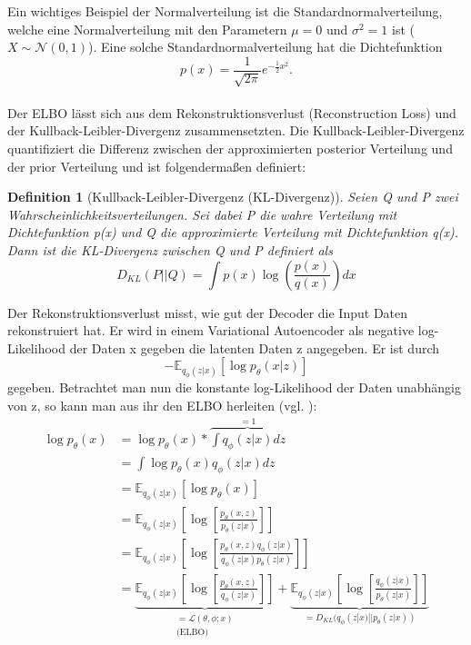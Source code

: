 \documentclass[%
thesis=student,%
coverpage=false,%
titlepage=false,%
headmarks=true, %
german,%
font=libertine, %
math=newpxtx, %
BCOR=5mm,%
coverBCOR=11mm%
]{tumbook}
\theoremstyle{break}
\newtheorem{definition}{Definition}[section]
\begin{document}
Ein wichtiges Beispiel der Normalverteilung ist die Standardnormalverteilung, welche eine Normalverteilung mit den Parametern $\mu = 0$ und  $\sigma^2 = 1$ ist ($X \sim \mathcal{N}(0,1)$). Eine solche Standardnormalverteilung hat die Dichtefunktion\\
$$p(x) = \frac{1}{\sqrt{2\pi}} e^{-\frac{1}{2}x^2}.$$
\\
Der ELBO lässt sich aus dem Rekonstruktionsverlust (Reconstruction Loss) und der Kullback-Leibler-Divergenz zusammensetzten. Die Kullback-Leibler-Divergenz quantifiziert die Differenz zwischen der approximierten posterior Verteilung und der prior Verteilung und ist folgendermaßen definiert:\\
\begin{definition}[Kullback-Leibler-Divergenz (KL-Divergenz)]
Seien Q und P zwei Wahrscheinlichkeitsverteilungen. 
Sei dabei P die wahre Verteilung mit Dichtefunktion p(x) und Q die approximierte Verteilung mit Dichtefunktion q(x). Dann ist die KL-Divergenz zwischen Q und P definiert als
$$D_{KL}(P||Q)= \int p(x) \log \left(\frac{p(x)}{q(x)} \right)dx$$
\end{definition}\noindent
Der Rekonstruktionsverlust misst, wie gut der Decoder die Input Daten rekonstruiert hat. Er wird in einem Variational Autoencoder als negative log-Likelihood der Daten x gegeben die latenten Daten z angegeben. Er ist durch 
$$-\mathbb{E}_{q_\phi(z|x)}[\log p_\theta(x|z)] $$ gegeben. Betrachtet man nun die konstante log-Likelihood der Daten unabhängig von z, so kann man aus ihr den ELBO herleiten (vgl. \cite{IntroductiontoVAEs}):\\
\begin{align}
 	\log p_\theta(x) &= \log p_\theta(x) * \overbrace{\int q_\phi(z|x) dz}^{=1} \\
 	&= \int \log p_\theta(x) q_\phi(z|x) dz \\
 	&= \mathbb{E}_{q_\phi(z|x)}[\log p_\theta(x)] \\
 	&= \mathbb{E}_{q_\phi(z|x)}\left[\log\left[ \frac{p_\theta(x,z)}{p_\theta(z|x)}\right]\right] \\
 	&= \mathbb{E}_{q_\phi(z|x)}\left[\log\left[ \frac{p_\theta(x,z)q_\phi(z|x)}{q_\phi(z|x)p_\theta(z|x)}\right]\right] \\
 	&= \underbrace{\mathbb{E}_{q_\phi(z|x)}\left[\log\left[ \frac{p_\theta(x,z)}{q_\phi(z|x)}\right]\right]}_{\substack{\text{$= \mathcal{L}(\theta,\phi;x)$}\\\text{(ELBO)}}} + \underbrace{\mathbb{E}_{q_\phi(z|x)}\left[\log\left[ \frac{q_\phi(z|x)}{p_\theta(z|x)}\right]\right]}_{=D_{KL}(q_\phi(z|x)||p_\theta(z|x))} \label{ELBO & DKL Gleichung}
\end{align}
\end{document}
